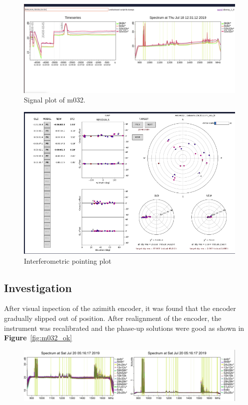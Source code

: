 \documentclass{article}
\begin{document}
{\begin{appendices}
 \begin{figure}[H]
	\centering
	\includegraphics[scale=0.23]{m032_slope.png}
	
	\caption{Signal plot of m032.}
	\label{fig:m032slope}
\end{figure}
	
\begin{figure}[H]
	\centering
	\includegraphics[scale=0.39]{m032_pointing.png}
	
	\caption{Interferometric pointing plot}
	\label{fig:m032point}
\end{figure}

\subsection{Investigation}
After visual inpection of the azimith encoder, it was found that the encoder gradually slipped out of position. After realignment of the encoder, the instrument was recalibrated and the phase-up solutions were good as shown in  \textbf{Figure}~\ref{fig:m032_ok}
\begin{figure}[H]
	\centering
	\includegraphics[scale=0.28]{m032_ok.png}
	

\end{figure}
\end{appendices}}
\end{document}
